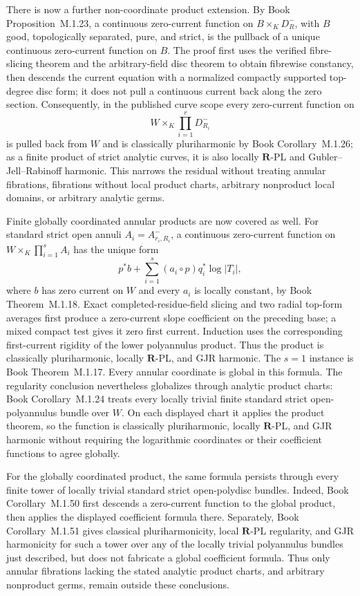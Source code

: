 \documentclass[11pt,a4paper]{article}
\theoremstyle{definition}
\theoremstyle{remark}
\begin{document}
There is now a further non-coordinate product extension.  By
Book Proposition~M.1.23, a continuous zero-current function on
\(B\times_KD_R^-\), with \(B\) good, topologically separated, pure, and
strict, is the pullback of a unique continuous zero-current function on
\(B\).  The proof first uses the verified fibre-slicing theorem and the
arbitrary-field disc theorem to obtain fibrewise constancy, then descends
the current equation with a normalized compactly supported top-degree disc
form; it does not pull a continuous current back along the zero section.
Consequently, in the published curve scope every zero-current function on
\[
                         W\times_K\prod_{i=1}^rD_{R_i}^-
\]
is pulled back from \(W\) and is classically pluriharmonic by
Book Corollary~M.1.26; as a finite product of
strict analytic curves, it is also locally \(\mathbf R\)-PL and
Gubler--Jell--Rabinoff harmonic.  This narrows the residual without treating
annular fibrations, fibrations without local product charts, arbitrary
nonproduct local domains, or arbitrary analytic germs.

Finite globally coordinated annular products are now covered as well.  For
standard strict open annuli \(A_i=A^-_{r_i,R_i}\), a continuous zero-current
function on \(W\times_K\prod_{i=1}^sA_i\) has the unique form
\[
 p^*b+\sum_{i=1}^s(a_i\circ p)q_i^*\log|T_i|,
\]
where \(b\) has zero current on \(W\) and every \(a_i\) is locally constant,
by Book Theorem~M.1.18.  Exact
completed-residue-field slicing and two radial top-form averages first
produce a zero-current slope coefficient on the preceding base; a mixed
compact test gives it zero first current.  Induction uses the corresponding
first-current rigidity of the lower polyannulus product.  Thus the product
is classically pluriharmonic, locally \(\mathbf R\)-PL, and GJR harmonic.
The \(s=1\) instance is
Book Theorem~M.1.17.  Every annular coordinate
is global in this formula.  The regularity conclusion nevertheless
globalizes through analytic product charts:
Book Corollary~M.1.24 treats every locally
trivial finite standard strict open-polyannulus bundle over \(W\).  On each
displayed chart it applies the product theorem, so the function is
classically pluriharmonic, locally \(\mathbf R\)-PL, and GJR harmonic without
requiring the logarithmic coordinates or their coefficient functions to
agree globally.

For the globally coordinated product, the same formula persists through
every finite tower of locally trivial standard strict open-polydisc bundles.
Indeed, Book Corollary~M.1.50 first descends
a zero-current function to the global product, then applies the displayed
coefficient formula there.  Separately,
Book Corollary~M.1.51 gives
classical pluriharmonicity, local \(\mathbf R\)-PL regularity, and GJR
harmonicity for such a tower over any of the locally trivial polyannulus
bundles just described, but does not fabricate a global coefficient formula.
Thus only annular fibrations lacking the stated
analytic product charts, and arbitrary nonproduct germs, remain outside
these conclusions.
\end{document}
